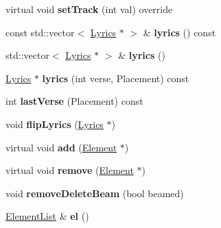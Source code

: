 \begin{DoxyCompactItemize}
virtual void {\bfseries set\+Track} (int val) override
\item 
\mbox{\label{class_ms_1_1_chord_rest_ad0aede93707644473a04a23666e6a2f1}} 
const std\+::vector$<$ \hyperlink{class_ms_1_1_lyrics}{Lyrics} $\ast$ $>$ \& {\bfseries lyrics} () const
\item 
\mbox{\label{class_ms_1_1_chord_rest_a57fbf117cc5117ddfaf48189e30e96e8}} 
std\+::vector$<$ \hyperlink{class_ms_1_1_lyrics}{Lyrics} $\ast$ $>$ \& {\bfseries lyrics} ()
\item 
\mbox{\label{class_ms_1_1_chord_rest_a1ad2b961f13371e44f17cec7041b6507}} 
\hyperlink{class_ms_1_1_lyrics}{Lyrics} $\ast$ {\bfseries lyrics} (int verse, Placement) const
\item 
\mbox{\label{class_ms_1_1_chord_rest_a81732a1c7499677523fa2d2b0b254902}} 
int {\bfseries last\+Verse} (Placement) const
\item 
\mbox{\label{class_ms_1_1_chord_rest_aa0fb23cee73659c126a07ebdbfbf7684}} 
void {\bfseries flip\+Lyrics} (\hyperlink{class_ms_1_1_lyrics}{Lyrics} $\ast$)
\item 
\mbox{\label{class_ms_1_1_chord_rest_a5ea14351e92562c2439ac0a357c38f93}} 
virtual void {\bfseries add} (\hyperlink{class_ms_1_1_element}{Element} $\ast$)
\item 
\mbox{\label{class_ms_1_1_chord_rest_a488cf820c912a7eb8fd1d4f80cb74e7a}} 
virtual void {\bfseries remove} (\hyperlink{class_ms_1_1_element}{Element} $\ast$)
\item 
\mbox{\label{class_ms_1_1_chord_rest_a8f87ff99331819e91eea762687ef8950}} 
void {\bfseries remove\+Delete\+Beam} (bool beamed)
\item 
\mbox{\label{class_ms_1_1_chord_rest_af6cfd36f9d571c4d7bbc93f474483ded}} 
\hyperlink{class_ms_1_1_element_list}{Element\+List} \& {\bfseries el} ()
\item 
\mbox{\label{class_ms_1_1_chord_rest_a87bf56f4bd5c2e90611fcd134dabac25}} 

\end{DoxyCompactItemize}
